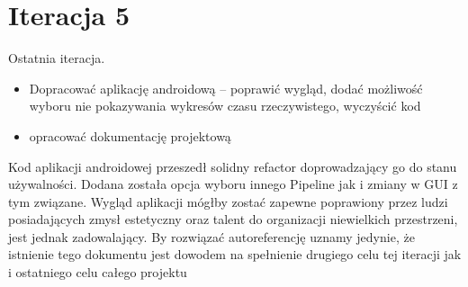 \section{Iteracja 5}

\begin{Note}

Ostatnia iteracja. 


\begin{itemize}
    \item Dopracować aplikację androidową -- poprawić wygląd, dodać możliwość wyboru nie pokazywania wykresów czasu rzeczywistego, wyczyścić kod
    \item opracować dokumentację projektową
\end{itemize}

Kod aplikacji androidowej przeszedł solidny refactor doprowadzający go do stanu używalności. Dodana została opcja wyboru innego Pipeline jak i zmiany w GUI z tym związane. Wygląd aplikacji mógłby zostać zapewne poprawiony przez ludzi posiadających zmysł estetyczny oraz talent do organizacji niewielkich przestrzeni, jest jednak zadowalający.
By rozwiązać autoreferencję uznamy jedynie, że istnienie tego dokumentu jest dowodem na spełnienie drugiego celu tej iteracji jak i ostatniego celu całego projektu

\end{Note}

\nocite{*}

